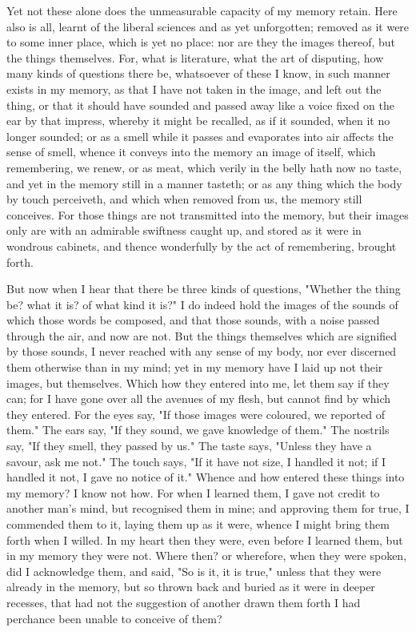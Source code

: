 \documentclass[b5paper,openright,12pt,twoside]{book}
\begin{document}
Yet not these alone does the unmeasurable capacity of my memory retain.
Here also is all, learnt of the liberal sciences and as yet unforgotten;
removed as it were to some inner place, which is yet no place: nor
are they the images thereof, but the things themselves. For, what is
literature, what the art of disputing, how many kinds of questions there
be, whatsoever of these I know, in such manner exists in my memory, as
that I have not taken in the image, and left out the thing, or that it
should have sounded and passed away like a voice fixed on the ear by
that impress, whereby it might be recalled, as if it sounded, when it
no longer sounded; or as a smell while it passes and evaporates into air
affects the sense of smell, whence it conveys into the memory an image
of itself, which remembering, we renew, or as meat, which verily in
the belly hath now no taste, and yet in the memory still in a manner
tasteth; or as any thing which the body by touch perceiveth, and which
when removed from us, the memory still conceives. For those things
are not transmitted into the memory, but their images only are with
an admirable swiftness caught up, and stored as it were in wondrous
cabinets, and thence wonderfully by the act of remembering, brought
forth.

But now when I hear that there be three kinds of questions, "Whether the
thing be? what it is? of what kind it is?" I do indeed hold the images
of the sounds of which those words be composed, and that those sounds,
with a noise passed through the air, and now are not. But the things
themselves which are signified by those sounds, I never reached with any
sense of my body, nor ever discerned them otherwise than in my mind; yet
in my memory have I laid up not their images, but themselves. Which how
they entered into me, let them say if they can; for I have gone over all
the avenues of my flesh, but cannot find by which they entered. For the
eyes say, "If those images were coloured, we reported of them." The ears
say, "If they sound, we gave knowledge of them." The nostrils say, "If
they smell, they passed by us." The taste says, "Unless they have a
savour, ask me not." The touch says, "If it have not size, I handled
it not; if I handled it not, I gave no notice of it." Whence and how
entered these things into my memory? I know not how. For when I learned
them, I gave not credit to another man's mind, but recognised them in
mine; and approving them for true, I commended them to it, laying them
up as it were, whence I might bring them forth when I willed. In my
heart then they were, even before I learned them, but in my memory
they were not. Where then? or wherefore, when they were spoken, did I
acknowledge them, and said, "So is it, it is true," unless that they
were already in the memory, but so thrown back and buried as it were in
deeper recesses, that had not the suggestion of another drawn them forth
I had perchance been unable to conceive of them?
\end{document}
